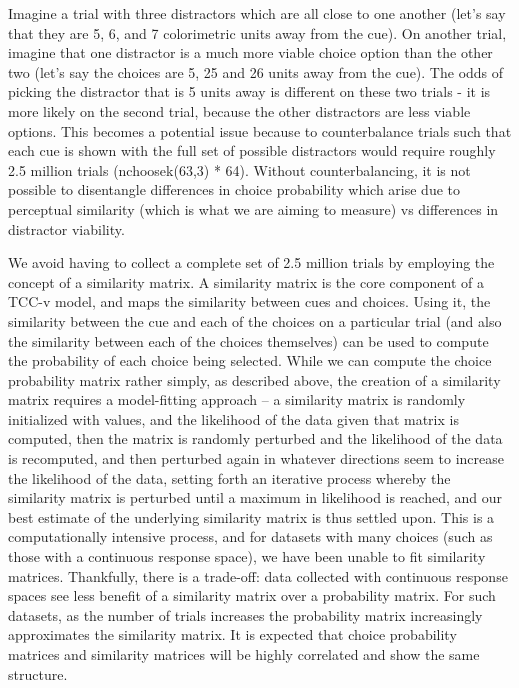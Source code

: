 \documentclass[9pt,biorxiv,lineno,onehalfspacing]{lapreprint}
\begin{document}
\begin{refsection}
Imagine a trial with three distractors which are all close to one another (let's say that they are 5, 6, and 7 colorimetric units away from the cue).
On another trial, imagine that one distractor is a much more viable choice option than the other two (let's say the choices are 5, 25 and 26 units away from the cue).
The odds of picking the distractor that is 5 units away is different on these two trials - it is more likely on the second trial, because the other distractors are less viable options. 
This becomes a potential issue because to counterbalance trials such that each cue is shown with the full set of possible distractors would require roughly 2.5 million trials (nchoosek(63,3) * 64).
Without counterbalancing, it is not possible to disentangle differences in choice probability which arise due to perceptual similarity (which is what we are aiming to measure) vs differences in distractor viability.

We avoid having to collect a complete set of 2.5 million trials by employing the concept of a similarity matrix.
A similarity matrix is the core component of a TCC-v model, and maps the similarity between cues and choices. 
Using it, the similarity between the cue and each of the choices on a particular trial (and also the similarity between each of the choices themselves) can be used to compute the probability of each choice being selected.
While we can compute the choice probability matrix rather simply, as described above, the creation of a similarity matrix requires a model-fitting approach – a similarity matrix is randomly initialized with values, and the likelihood of the data given that matrix is computed, then the matrix is randomly perturbed and the likelihood of the data is recomputed, and then perturbed again in whatever directions seem to increase the likelihood of the data, setting forth an iterative process whereby the similarity matrix is perturbed until a maximum in likelihood is reached, and our best estimate of the underlying similarity matrix is thus settled upon.
This is a computationally intensive process, and for datasets with many choices (such as those with a continuous response space), we have been unable to fit similarity matrices. 
Thankfully, there is a trade-off: data collected with continuous response spaces see less benefit of a similarity matrix over a probability matrix. 
For such datasets, as the number of trials increases the probability matrix increasingly approximates the similarity matrix.
It is expected that choice probability matrices and similarity matrices will be highly correlated and show the same structure.


\end{refsection}
\end{document}
